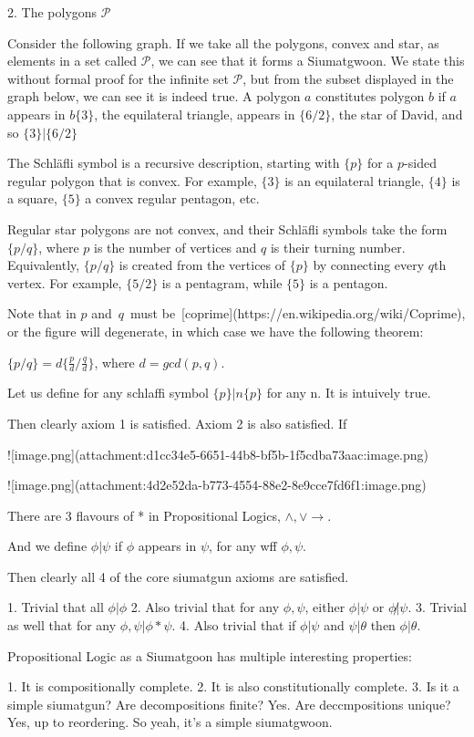     2. The polygons $\mathcal{P}$
        
        Consider the following graph. If we take all the polygons, convex and star, as elements in a set called $\mathcal{P}$, we can see that it forms a Siumatgwoon.  We state this without formal proof for the infinite set $\mathcal{P}$, but from the subset displayed in the graph below, we can see it is indeed true. A polygon $a$ constitutes polygon $b$ if $a$ appears in $b$$\{3\}$, the equilateral triangle, appears in $\{6/2\}$, the star of David, and so $\{3\} |\{6/2\}$
        
        The Schläfli symbol is a recursive description, starting with $\{p\}$ for a $p$-sided regular polygon that is convex. For example, $\{3\}$ is an equilateral triangle, $\{4\}$ is a square, $\{5\}$ a convex regular pentagon, etc.
        
        Regular star polygons are not convex, and their Schläfli symbols take the form $\{p/q\}$, where $p$ is the number of vertices and $q$ is their turning number. Equivalently,  $\{p/q\}$ is created from the vertices of  $\{p\}$ by connecting every  $q$th vertex. For example,  $\{5/2\}$ is a pentagram, while  $\{5\}$ is a pentagon.
        
        Note that in $p$ and $q$ must be [coprime](https://en.wikipedia.org/wiki/Coprime), or the figure will degenerate, in which case we have the following theorem:
        
        $\{p/q\}=d\{ \frac{p}{d} / \frac{q}{d}  \}$, where $d=gcd(p,q)$.
        
        Let us define for any schlaffi symbol $\{p\} | n\{p\}$ for any n. It is intuively true.
        
        Then clearly axiom 1 is satisfied. Axiom 2 is also satisfied. If 
        
         
        
    
    ![image.png](attachment:d1cc34e5-6651-44b8-bf5b-1f5cdba73aac:image.png)
    
    ![image.png](attachment:4d2e52da-b773-4554-88e2-8e9cce7fd6f1:image.png)
    
    There are 3 flavours of * in Propositional Logics, $\wedge, \vee →$. 
    
    And we define $\phi | \psi$ if $\phi$ appears in $\psi$, for any wff $\phi, \psi$.
    
    Then clearly all 4 of the core siumatgun axioms are satisfied. 
    
    1. Trivial that all $\phi | \phi$
    2. Also trivial that for any $\phi, \psi$, either $\phi|\psi$ or $\phi\not|\psi$.
    3. Trivial as well that for any $\phi,\psi | \phi * \psi$.
    4. Also trivial that if $\phi | \psi$ and $\psi | \theta$ then $\phi | \theta$.
    
    Propositional Logic as a Siumatgoon has multiple interesting properties: 
    
    1. It is compositionally complete. 
    2. It is also constitutionally complete. 
    3. Is it a simple siumatgun? Are decompositions finite? Yes. Are deccmpositions unique? Yes, up to reordering. So yeah, it’s a simple siumatgwoon.